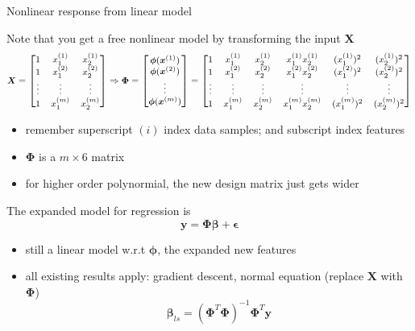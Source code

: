 \documentclass[ignorenonframetext,aspectratio=169]{beamer}
\providecommand{\tightlist}{%
  \setlength{\itemsep}{0pt}\setlength{\parskip}{0pt}}
\newcommand{\vv}[1]{\boldsymbol{#1}}
\newcommand{\di}[2]{\ensuremath{ #1^{(#2)}}}
\newcommand{\Di}[2]{\ensuremath{ \vv{#1}^{(#2)}}}
\begin{document}
\begin{frame}{Nonlinear response from linear model}
\protect\hypertarget{nonlinear-response-from-linear-model}{}

Note that you get a free nonlinear model by transforming the input
\(\vv{X}\)
\[\footnotesize \vv{X} = \begin{bmatrix} 1& \di{x}{1}_1& \di{x}{1}_2 \\
1& \di{x}{2}_1& \di{x}{2}_2 \\
\vdots& \vdots& \vdots \\
1 &  \di{x}{m}_1& \di{x}{m}_2
\end{bmatrix} \Rightarrow \vv{\Phi} =\begin{bmatrix} \vv{\phi}(\Di{x}{1}) \\
\vv{\phi}(\Di{x}{2}) \\
\vdots \\
\vv{\phi}(\Di{x}{m})
\end{bmatrix} = \begin{bmatrix} 1& \di{x}{1}_1& \di{x}{1}_2& \di{x}{1}_1 \di{x}{1}_2& (\di{x}{1}_1)^2 & (\di{x}{1}_2)^2\\
1& \di{x}{2}_1& \di{x}{2}_2& \di{x}{2}_1 \di{x}{2}_2& (\di{x}{2}_1)^2 & (\di{x}{2}_2)^2\\
\vdots& \vdots& \vdots & \vdots & \vdots & \vdots\\
1& \di{x}{m}_1& \di{x}{m}_2& \di{x}{m}_1 \di{x}{m}_2& (\di{x}{m}_1)^2 & (\di{x}{m}_2)^2\\
\end{bmatrix}\]

\begin{itemize}
\tightlist
\item
  remember superscript \((i)\) index data samples; and subscript index
  features
\item
  \(\vv{\Phi}\) is a \(m\times 6\) matrix
\item
  for higher order polynormial, the new design matrix just gets wider
\end{itemize}

\normalsize

The expanded model for regression is
\[\vv{y} = \vv{\Phi}\vv{\beta} + \vv{\epsilon}\]

\begin{itemize}
\tightlist
\item
  still a linear model w.r.t \(\vv{\phi}\), the expanded new features
\item
  all existing results apply: gradient descent, normal equation (replace
  \(\vv{X}\) with \(\vv{\Phi}\))
  \[\vv{\beta}_{ls} =(\vv{\Phi}^T\vv{\Phi})^{-1}\vv{\Phi}^T\vv{y}\]
\end{itemize}

\end{frame}
\end{document}
